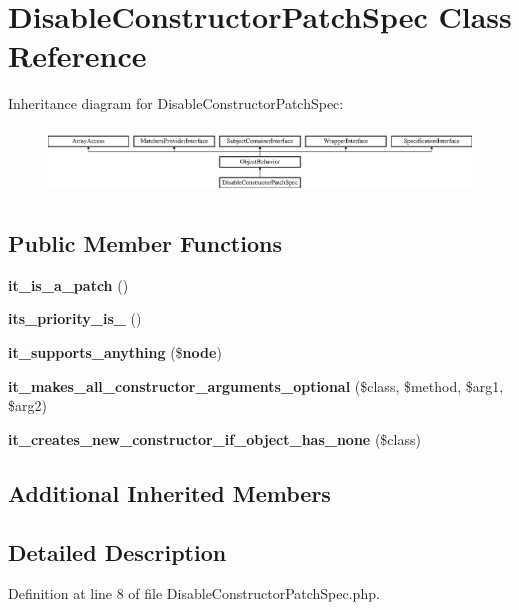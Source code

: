 \section{Disable\+Constructor\+Patch\+Spec Class Reference}
\label{classspec_1_1_prophecy_1_1_doubler_1_1_class_patch_1_1_disable_constructor_patch_spec}
Inheritance diagram for Disable\+Constructor\+Patch\+Spec\+:\begin{figure}[H]
\begin{center}
\leavevmode
\includegraphics[height=1.777778cm]{classspec_1_1_prophecy_1_1_doubler_1_1_class_patch_1_1_disable_constructor_patch_spec}
\end{center}
\end{figure}
\subsection*{Public Member Functions}
\begin{DoxyCompactItemize}
\item 
{\bf it\+\_\+is\+\_\+a\+\_\+patch} ()
\item 
{\bf its\+\_\+priority\+\_\+is\+\_} ()
\item 
{\bf it\+\_\+supports\+\_\+anything} (\${\bf node})
\item 
{\bf it\+\_\+makes\+\_\+all\+\_\+constructor\+\_\+arguments\+\_\+optional} (\$class, \$method, \$arg1, \$arg2)
\item 
{\bf it\+\_\+creates\+\_\+new\+\_\+constructor\+\_\+if\+\_\+object\+\_\+has\+\_\+none} (\$class)
\end{DoxyCompactItemize}
\subsection*{Additional Inherited Members}


\subsection{Detailed Description}


Definition at line 8 of file Disable\+Constructor\+Patch\+Spec.\+php.




